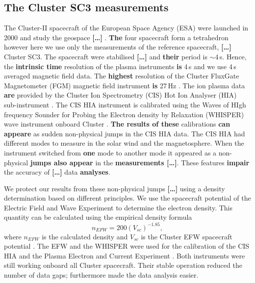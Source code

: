 \documentclass[linenumbers,draft]{agujournal}
\begin{document}
\subsection{The Cluster SC3 measurements}
\label{sec:cluster}

The Cluster-II spacecraft of the European Space Agency (ESA) were launched in 2000 and study the geospace \textbf{[\dots]} \citep{credland97:_clust_mission,escoubet01:_introd_clust}. \textbf{The} four spacecraft form a tetrahedron however here we use only the measurements of the reference spacecraft, \textbf{[\dots]} Cluster SC3. The spacecraft were stabilised \textbf{[\dots]} and \textbf{their} period is $\sim$4\,s. Hence, the \textbf{intrinsic time} resolution of the plasma instruments \textbf{is} 4\,s and we use 4\,s averaged magnetic field data. The \textbf{highest} resolution of the Cluster FluxGate Magnetometer (FGM) magnetic field instrument \textbf{is} 27\,Hz \citep{balogh97:_clust_magnet_field_inves,balogh01:_clust_magnet_field_inves}. The ion plasma data \textbf{are} provided by the Cluster Ion Spectrometry (CIS) Hot Ion Analyser (HIA) sub-instrument \citep{reme97:_clust_ion_spect_exper,reme01:_first_earth_clust_cis}. The CIS HIA instrument is calibrated using the Waves of HIgh frequency Sounder for Probing the Electron density by Relaxation (WHISPER) wave instrument onboard Cluster \citep{decreau01:_early_whisp_clust,trotignon10:_whisp_relax_sound_clust_activ_archiv,blagau13:_in_hot_ion_analy_clust,blagau14:_in_hot_ion_analy_clust}. \textbf{The results of these} calibrations \textbf{can appeare} as sudden non-physical jumps in the CIS HIA data. The CIS HIA had different modes to measure in the solar wind and the magnetosphere. When the instrument switched from \textbf{one} mode to another mode it appeared as a non-physical \textbf{jumps also appear} in the \textbf{measurements [\dots]}. These features \textbf{impair} the accuracy of \textbf{[\dots]} data \textbf{analyses}.

We protect our results from these non-physical jumps \textbf{[\dots]} using a density determination based on different principles. We use the spacecraft potential of the Electric Field and Wave Experiment \citep[EFW ;][]{gustafsson97:_elect_field_wave_exper_clust_mission,gustafsson01:_first_clust_efw} to determine the electron density. This quantity can be calculated using the empirical density formula 
\begin{equation}\label{eq:empdens}
n_{EFW}=200(V_{sc})^{-1.85},
\end{equation}
where $n_{EFW}$ is the calculated density and $V_{sc}$ is the Cluster EFW spacecraft potential \citep{trotignon10:_whisp_relax_sound_clust_activ_archiv,trotignon11:_calib_repor_whisp_measur_clust}. The EFW and the WHISPER were used for the calibration of the CIS HIA and the Plasma Electron and Current Experiment \citep[PEACE;][]{johnstone97:_peace,fazakerley10:_peace_data_clust_activ_archiv,fazakerley10:_clust_peace_in_calib_status}. Both instruments were still working onboard all Cluster spacecraft. Their stable operation reduced the number of data gaps; furthermore made the data analysis easier.
\end{document}
